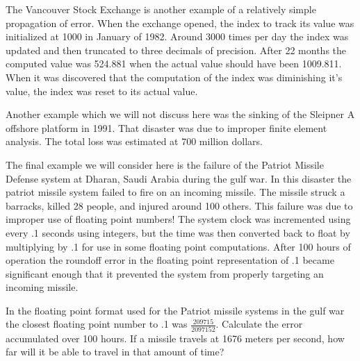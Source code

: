 The Vancouver Stock Exchange is another example of a relatively simple propagation of error.
When the exchange opened, the index to track its value was initialized at 1000 in January of 1982.
Around 3000 times per day the index was updated and then truncated to three decimals of precision.
After 22 months the computed value was 524.881 when the actual value should have been 1009.811.
When it was discovered that the computation of the index was diminishing it's value, the index was reset to its actual value.

Another example which we will not discuss here was the sinking of the Sleipner A offshore platform in 1991.
That disaster was due to improper finite element analysis.
The total loss was estimated at 700 million dollars.

The final example we will consider here is the failure of the Patriot Missile Defense system at Dharan, Saudi Arabia during the gulf war.
In this disaster the patriot missile system failed to fire on an incoming missile.
The missile struck a barracks, killed 28 people, and injured around 100 others.
This failure was due to improper use of floating point numbers!
The system clock was incremented using every .1 seconds using integers, but the time was then converted back to float by multiplying by .1 for use in some floating point computations.
After 100 hours of operation the roundoff error in the floating point representation of .1 became significant enough that it prevented the system from properly targeting an incoming missile.

\begin{problem}
In the floating point format used for the Patriot missile systems in the gulf war the closest floating point number to .1 was $\frac{209715}{2097152}$.
Calculate the error accumulated over 100 hours.
If a missile travels at 1676 meters per second, how far will it be able to travel in that amount of time?
\end{problem}